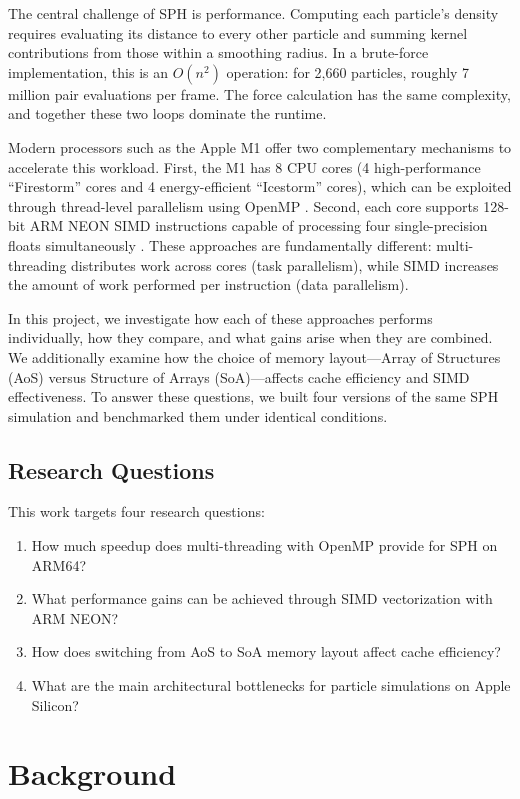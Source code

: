 \documentclass[12pt, a4paper]{article}
\begin{document}
The central challenge of SPH is performance. Computing each particle's density requires evaluating its distance to every other particle and summing kernel contributions from those within a smoothing radius. In a brute-force implementation, this is an $O(n^2)$ operation: for 2,660 particles, roughly 7 million pair evaluations per frame. The force calculation has the same complexity, and together these two loops dominate the runtime.

Modern processors such as the Apple M1 offer two complementary mechanisms to accelerate this workload. First, the M1 has 8 CPU cores (4 high-performance ``Firestorm'' cores and 4 energy-efficient ``Icestorm'' cores), which can be exploited through thread-level parallelism using OpenMP \cite{openmp2018specification}. Second, each core supports 128-bit ARM NEON SIMD instructions capable of processing four single-precision floats simultaneously \cite{arm2020neon}. These approaches are fundamentally different: multi-threading distributes work across cores (task parallelism), while SIMD increases the amount of work performed per instruction (data parallelism).

In this project, we investigate how each of these approaches performs individually, how they compare, and what gains arise when they are combined. We additionally examine how the choice of memory layout---Array of Structures (AoS) versus Structure of Arrays (SoA)---affects cache efficiency and SIMD effectiveness. To answer these questions, we built four versions of the same SPH simulation and benchmarked them under identical conditions.

\subsection{Research Questions}
This work targets four research questions:
\begin{enumerate}
    \item How much speedup does multi-threading with OpenMP provide for SPH on ARM64?
    \item What performance gains can be achieved through SIMD vectorization with ARM NEON?
    \item How does switching from AoS to SoA memory layout affect cache efficiency?
    \item What are the main architectural bottlenecks for particle simulations on Apple Silicon?
\end{enumerate}

\section{Background}
\end{document}
